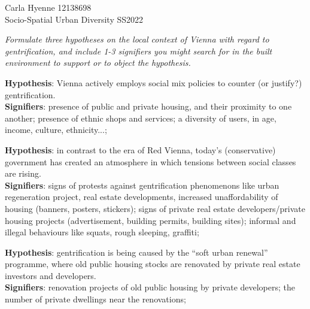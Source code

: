 \documentclass{article}
\begin{document}
\pagebreak

\begin{flushright}
Carla Hyenne 12138698\\
Socio-Spatial Urban Diversity SS2022
\end{flushright}

\textit{Formulate three hypotheses on the local context of Vienna with regard to gentrification, and include 1-3 signifiers you might search for in the built environment to support or to object the hypothesis.}

\textbf{Hypothesis}: Vienna actively employs social mix policies to counter (or justify?) gentrification.\\
\textbf{Signifiers}: presence of public and private housing, and their proximity to one another; presence of ethnic shops and services; a diversity of users, in age, income, culture, ethnicity...;

\textbf{Hypothesis}: in contrast to the era of Red Vienna, today's (conservative) government has created an atmosphere in which tensions between social classes are rising. \\
\textbf{Signifiers}: signs of protests against gentrification phenomenons like urban regeneration project, real estate developments, increased unaffordability of housing (banners, posters, stickers); signs of private real estate developers/private housing projects (advertisement, building permits, building sites); informal and illegal behaviours like squats, rough sleeping, graffiti;

\textbf{Hypothesis}: gentrification is being caused by the ``soft urban renewal'' programme, where old public housing stocks are renovated by private real estate investors and developers. \\
\textbf{Signifiers}: renovation projects of old public housing by private developers; the number of private dwellings near the renovations;
\end{document}
